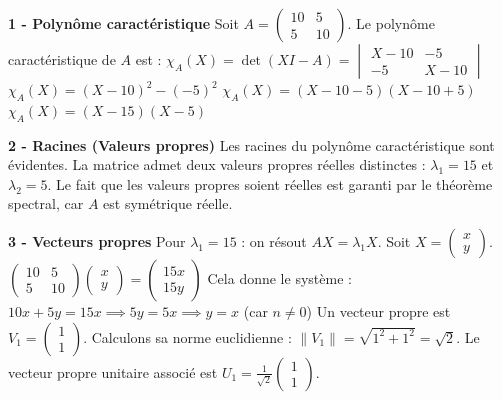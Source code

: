 \documentclass[11pt,a4paper]{article}
\begin{document}
\textbf{1 - Polynôme caractéristique}
Soit $A = \begin{pmatrix} 10 & 5 \\ 5 & 10 \end{pmatrix}$.
Le polynôme caractéristique de $A$ est :
$\chi_A(X) = \det(X I - A) = \begin{vmatrix} X - 10 & -5 \\ -5 & X - 10 \end{vmatrix}$
$\chi_A(X) = (X - 10)^2 - (-5)^2$
$\chi_A(X) = (X - 10 - 5)(X - 10 + 5)$
$\chi_A(X) = (X - 15)(X - 5)$

\textbf{2 - Racines (Valeurs propres)}
Les racines du polynôme caractéristique sont évidentes. La matrice admet deux valeurs propres réelles distinctes :
$\lambda_1 = 15$ et $\lambda_2 = 5$.
Le fait que les valeurs propres soient réelles est garanti par le théorème spectral, car $A$ est symétrique réelle.

\textbf{3 - Vecteurs propres}
Pour $\lambda_1 = 15$ : on résout $AX = \lambda_1 X$.
Soit $X = \begin{pmatrix} x \\ y \end{pmatrix}$.
$\begin{pmatrix} 10 & 5 \\ 5 & 10 \end{pmatrix} \begin{pmatrix} x \\ y \end{pmatrix} = \begin{pmatrix} 15x \\ 15y \end{pmatrix}$
Cela donne le système :
$10x + 5y = 15x \implies 5y = 5x \implies y = x$ (car $n \neq 0$)
Un vecteur propre est $V_1 = \begin{pmatrix} 1 \\ 1 \end{pmatrix}$.
Calculons sa norme euclidienne : $\|V_1\| = \sqrt{1^2 + 1^2} = \sqrt{2}$.
Le vecteur propre unitaire associé est $U_1 = \frac{1}{\sqrt{2}} \begin{pmatrix} 1 \\ 1 \end{pmatrix}$.
\end{document}
